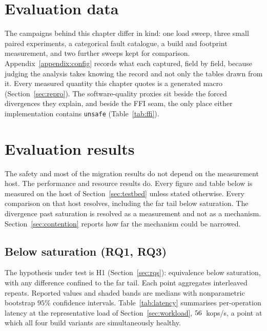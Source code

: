 \documentclass[english,oneside,a4paper,censored,csm,software-track-2020]{HYthesisML}
\begin{document}
\section{Evaluation data}\label{sec:evaldata}
The campaigns behind this chapter differ in kind: one load sweep, three small paired
experiments, a categorical fault catalogue, a build and footprint measurement, and two further
sweeps kept for comparison. Appendix~\ref{appendix:config} records what each captured, field by
field, because judging the analysis takes knowing the record and not only the tables drawn from
it. Every measured quantity this chapter quotes is a generated macro
(Section~\ref{sec:repro}). The software-quality proxies sit beside the forced divergences they
explain, and beside the FFI seam, the only place either implementation contains \texttt{unsafe}
(Table~\ref{tab:ffi}).

\section{Evaluation results}
The safety and most of the migration results do not depend on the measurement host. The
performance and resource results do. Every figure and table below is measured on the host of
Section~\ref{sec:testbed} unless stated otherwise. Every comparison on that host resolves,
including the far tail below saturation. The divergence past saturation is resolved as a
measurement and not as a mechanism. Section~\ref{sec:contention} reports how far the mechanism
could be narrowed.

\subsection{Below saturation (RQ1, RQ3)}\label{sec:perfresults}
The hypothesis under test is H1 (Section~\ref{sec:rqs}): equivalence below saturation, with any
difference confined to the far tail. Each point aggregates \NRepeats{} interleaved repeats.
Reported values and shaded bands are medians with nonparametric bootstrap $95\%$ confidence
intervals. Table~\ref{tab:latency} summarises per-operation latency at the representative load of
Section~\ref{sec:workload}, $56$~kops/s, a point at which all four build variants are
simultaneously healthy.
\end{document}
